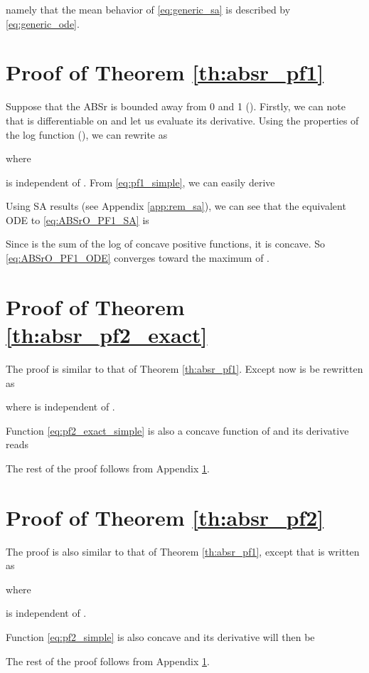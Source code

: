 \documentclass[conference]{IEEEtran}
\begin{document}
	namely that the mean behavior of \eqref{eq:generic_sa} is described by \eqref{eq:generic_ode}.

\section{Proof of Theorem \ref{th:absr_pf1}}\label{app:absr_pf1}
	Suppose that the \ac{ABSr}  is bounded away from 0 and 1 (). Firstly, we can note that  is differentiable on  and let us evaluate its derivative. Using the properties of the log function (), we can rewrite  as
	
	where
	
is independent of . From  \eqref{eq:pf1_simple}, we can easily derive
	
Using \ac{SA} results (see Appendix \ref{app:rem_sa}), we can see that the equivalent \ac{ODE} to \eqref{eq:ABSrO_PF1_SA} is
	
	Since  is the sum of the log of concave positive functions, it is concave. So \eqref{eq:ABSrO_PF1_ODE} converges toward the maximum of .

\section{Proof of Theorem \ref{th:absr_pf2_exact}} \label{app:absr_pf2_exact}
The proof is similar to that of Theorem \ref{th:absr_pf1}. Except now  is be rewritten as
	
	where  is independent of .
	
	Function \eqref{eq:pf2_exact_simple} is also a concave function of  and its derivative reads
	
	The rest of the proof follows from Appendix \ref{app:absr_pf1}.
	
\section{Proof of Theorem \ref{th:absr_pf2}} \label{app:absr_pf2}
The proof is also similar to that of Theorem \ref{th:absr_pf1}, except that  is written as
	
	where
	
is independent of .

	Function \eqref{eq:pf2_simple} is also concave and its derivative will then be
	
	
	The rest of the proof follows from Appendix \ref{app:absr_pf1}.



\end{document}
